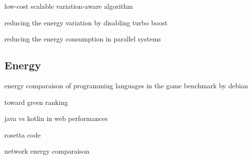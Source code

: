 








low-cost scalable variation-aware algorithm \cite{inadomi2015analyzing}

reducing the energy variation by disabling turbo boost \cite{acun2016variation}

reducing the energy consumption in parallel systems \cite{chasapis2016runtime}

\cite{marathe2017empirical}





\subsection{Energy}
energy comparaison of programming languages in the game benchmark by debian \cite{pereira2017energy}

toward green ranking \cite{couto2017towards}

java vs kotlin in web performances \cite{bujnowski2020java}

rosetta code \cite{nanz2015comparative} \cite{mirowski2020rosetta}

network energy comparaison \cite{balasubramanian2009energy}

